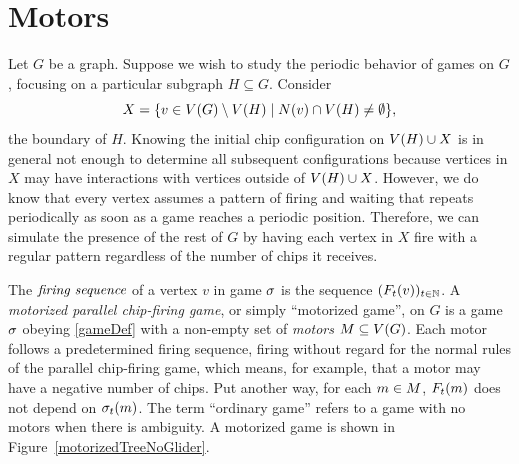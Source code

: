 \section{Motors}\label{motors}

Let $G$ be a graph. Suppose we wish to study the periodic behavior of games on
$G$, focusing on a particular subgraph $H \subseteq G$. Consider
\begin{equation*}
  X = \set{v \in \V \setminus \V[H]}{\N{v} \cap \V[H] \neq \emptyset},
\end{equation*}
the boundary of $H$. Knowing the initial chip configuration on $\V[H] \cup X$
is in general not enough to determine all subsequent configurations because
vertices in $X$ may have interactions with vertices outside of $\V[H] \cup
X$. However, we do know that every vertex assumes a pattern of firing and
waiting that repeats periodically as soon as a game reaches a periodic
position. Therefore, we can simulate the presence of the rest of $G$ by having
each vertex in $X$ fire with a regular pattern regardless of the number of
chips it receives.

The $\emph{firing sequence}$ of a vertex $v$ in game $\s$ is the sequence
$(\firing{v}{t})_{t \in \nats}$. A \emph{motorized parallel chip-firing game},
or simply ``motorized game'', on $G$ is a game $\s$ obeying \eqref{gameDef}
with a non-empty set of \emph{motors} $\mots \subseteq \V$. Each motor follows
a predetermined firing sequence, firing without regard for the normal rules of
the parallel chip-firing game, which means, for example, that a motor may have
a negative number of chips. Put another way, for each $m \in \mots$,
$\firing{m}{t}$ does not depend on $\chips{m}{t}$. The term ``ordinary game''
refers to a game with no motors when there is ambiguity. A motorized game is
shown in Figure~\ref{motorizedTreeNoGlider}.

